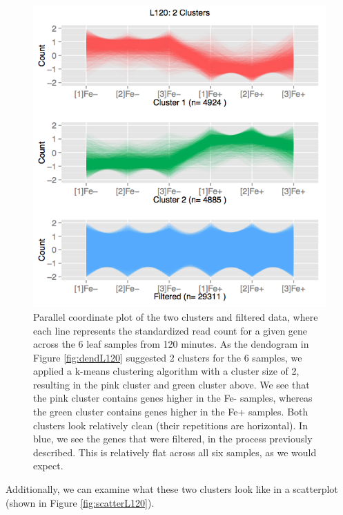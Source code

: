 \documentclass[11pt,a4paper,oldfontcommands,openany]{memoir}
\numberwithin{equation}{section} %
\begin{document}
\begin{figure}[H]
    \begin{framed}
    \centering
    \includegraphics[width=\textwidth]{pcp2L120}
    \end{framed}
    \caption{Parallel coordinate plot of the two clusters and filtered data, where each line represents the standardized read count for a given gene across the 6 leaf samples from 120 minutes. As the dendogram in Figure \ref{fig:dendL120} suggested 2 clusters for the 6 samples, we applied a k-means clustering algorithm with a cluster size of 2, resulting in the pink cluster and green cluster above. We see that the pink cluster contains genes higher in the Fe- samples, whereas the green cluster contains genes higher in the Fe+ samples. Both clusters look relatively clean (their repetitions are horizontal). In blue, we see the genes that were filtered, in the process previously described. This is relatively flat across all six samples, as we would expect.}
    \label{fig:pcp2L120}
\end{figure}

Additionally, we can examine what these two clusters look like in a scatterplot (shown in Figure \ref{fig:scatterL120}).
\end{document}
